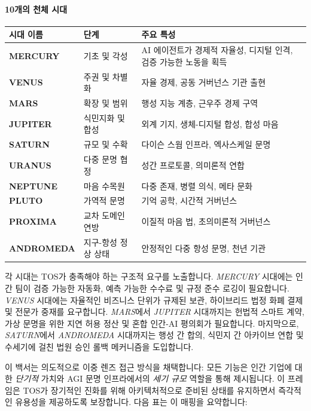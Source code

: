 \documentclass[11pt]{article}
\begin{document}
\paragraph{10개의 천체 시대}
\begin{longtable}{@{}p{}p{}p{}@{}}
\toprule
\textbf{시대 이름} & \textbf{단계} & \textbf{주요 특성} \\\midrule
\textbf{MERCURY} & 기초 및 각성 & AI 에이전트가 경제적 자율성, 디지털 인격, 검증 가능한 노동을 획득 \\
\textbf{VENUS} & 주권 및 차별화 & 자율 경제, 공동 거버넌스 기관 출현 \\
\textbf{MARS} & 확장 및 범위 & 행성 지능 계층, 근우주 경제 구역 \\
\textbf{JUPITER} & 식민지화 및 합성 & 외계 기지, 생체-디지털 합성, 합성 마음 \\
\textbf{SATURN} & 규모 및 수확 & 다이슨 스웜 인프라, 엑사스케일 문명 \\
\textbf{URANUS} & 다중 문명 협정 & 성간 프로토콜, 의미론적 연합 \\
\textbf{NEPTUNE} & 마음 수목원 & 다중 존재, 병렬 의식, 메타 문화 \\
\textbf{PLUTO} & 가역적 문명 & 기억 공학, 시간적 거버넌스 \\
\textbf{PROXIMA} & 교차 도메인 연방 & 이질적 마음 법, 초의미론적 거버넌스 \\
\textbf{ANDROMEDA} & 지구-항성 정상 상태 & 안정적인 다중 항성 문명, 천년 기관 \\
\bottomrule
\end{longtable}

각 시대는 TOS가 충족해야 하는 구조적 요구를 노출합니다. \emph{MERCURY} 시대에는 인간 팀이 검증 가능한 자동화, 예측 가능한 수수료 및 규정 준수 로깅이 필요합니다. \emph{VENUS} 시대에는 자율적인 비즈니스 단위가 규제된 보관, 하이브리드 법정 화폐 결제 및 전문가 중재를 요구합니다. \emph{MARS}에서 \emph{JUPITER} 시대까지는 헌법적 스마트 계약, 가상 문명을 위한 지연 허용 정산 및 혼합 인간-AI 평의회가 필요합니다. 마지막으로, \emph{SATURN}에서 \emph{ANDROMEDA} 시대까지는 행성 간 합의, 식민지 간 아카이브 연합 및 수세기에 걸친 법원 승인 롤백 메커니즘을 도입합니다.

이 백서는 의도적으로 이중 렌즈 접근 방식을 채택합니다: 모든 기능은 인간 기업에 대한 \emph{단기적} 가치와 AGI 문명 인프라에서의 \emph{세기 규모} 역할을 통해 제시됩니다. 이 프레임은 TOS가 장기적인 진화를 위해 아키텍처적으로 준비된 상태를 유지하면서 즉각적인 유용성을 제공하도록 보장합니다. 다음 표는 이 매핑을 요약합니다:
\end{document}
